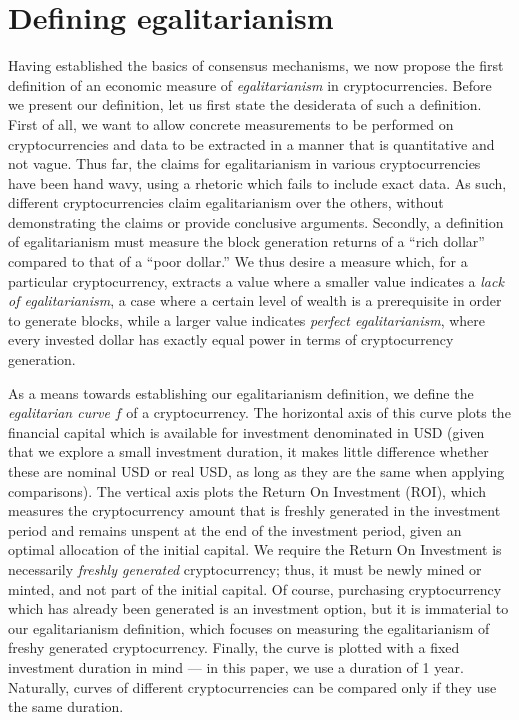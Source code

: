 
\section{Defining egalitarianism}\label{sec:definition}

Having established the basics of consensus mechanisms, we now propose the first
definition of an economic measure of \emph{egalitarianism} in cryptocurrencies.
Before we present our definition, let us first state the desiderata of such a
definition. First of all, we want to allow concrete measurements to be
performed on cryptocurrencies and data to be extracted in a manner that is
quantitative and not vague. Thus far, the claims for egalitarianism in various
cryptocurrencies have been hand wavy, using a rhetoric which fails to include
exact data. As such, different cryptocurrencies claim egalitarianism over the
others, without demonstrating the claims or provide conclusive arguments.
Secondly, a definition of egalitarianism must measure the block generation
returns of a ``rich dollar'' compared to that of a ``poor dollar.''
We thus desire a
measure which, for a particular cryptocurrency, extracts a value where a smaller
value indicates a \emph{lack of egalitarianism}, \ie a
case where a certain level of wealth is a prerequisite in order to generate
blocks, while a larger value indicates \emph{perfect egalitarianism}, where
every invested dollar has exactly equal power in terms of cryptocurrency
generation.

As a means towards establishing our egalitarianism definition, we define the
\emph{egalitarian curve} $f$ of a cryptocurrency. The horizontal axis of this
curve plots the financial capital which is available for investment denominated
in USD (given that we explore
a small investment duration, it makes little difference whether these are
nominal USD or real USD, as long as they are the same when applying comparisons).  The
vertical axis plots the Return On Investment (ROI), which measures the
cryptocurrency amount that is freshly generated in the investment period and
remains unspent at the end of the investment period,
given an optimal allocation of the initial capital. We require
the Return On Investment is necessarily \emph{freshly generated}
cryptocurrency; thus, it must be newly mined or minted, and not part of the
initial capital. Of course, purchasing
cryptocurrency which has already been generated is an investment option, but it
is immaterial to our egalitarianism definition, which focuses on measuring the
egalitarianism of freshy generated cryptocurrency.  Finally, the curve is
plotted with a fixed investment duration in mind --- in this paper, we use a
duration of 1 year.  Naturally, curves of different cryptocurrencies can be
compared only if they use the same duration.

